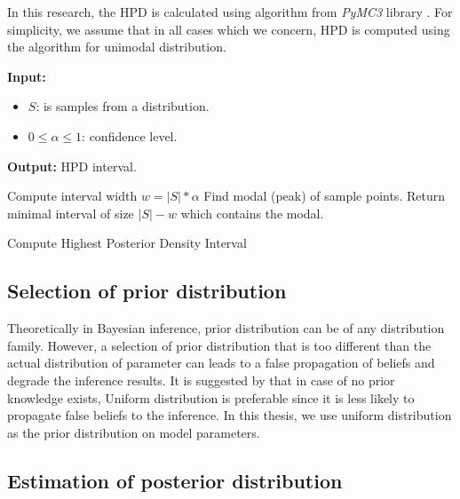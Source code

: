 In this research, the HPD is calculated using algorithm from \textit{PyMC3} library
\cite{salvatier2016pymc3}. For simplicity, we assume that in all cases which we concern, HPD is
computed using the algorithm for unimodal distribution.
\begin{algorithm}[H]
    \footnotesize{
        \hspace*{\algorithmicindent} \textbf{Input:}
        \begin{itemize}[noitemsep,topsep=0pt]
            \item $S$: is samples from a distribution.
            \item $0\leq \alpha \leq 1$: confidence level.
        \end{itemize}
        \hspace*{\algorithmicindent} \textbf{Output:} HPD interval.
    }
    \begin{algorithmic}[1]
        \State Compute interval width $w = |S| * \alpha$
        \State Find modal (peak) of sample points.
        \State Return minimal interval of size $|S| - w$ which contains the modal.
        \EndProcedure
    \end{algorithmic}
    \caption{Compute Highest Posterior Density Interval}
    \label{alg:hpd}
\end{algorithm}

\subsection{Selection of prior distribution}
Theoretically in Bayesian inference, prior distribution can be of any distribution family. However,
a selection of prior distribution that is too different than the actual distribution of parameter
can leads to a false propagation of beliefs and degrade the inference results. It is suggested by
\cite{polgreen2016data} that in case of no prior knowledge exists, Uniform distribution is
preferable since it is less likely to propagate false beliefs to the inference. In this thesis, we
use uniform distribution as the prior distribution on model parameters.

\subsection{Estimation of posterior distribution}

